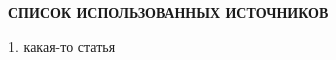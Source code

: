 \begin{center}
\large{\textbf{СПИСОК ИСПОЛЬЗОВАННЫХ ИСТОЧНИКОВ}}\\
\end{center}
1. какая-то статья 

